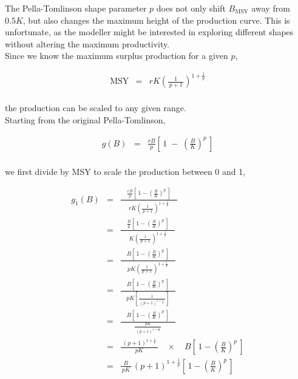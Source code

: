 \documentclass[fleqn]{article}
\newcommand{\MSY}{\mathrm{MSY}}
\newcommand{\msy}{_\mathrm{MSY}}
\begin{document}
\newpage

The Pella-Tomlinson shape parameter $p$ does not only shift $B\msy$ away from
$0.5K$, but also changes the maximum height of the production curve. This is
unfortunate, as the modeller might be interested in exploring different
shapes without altering the maximum productivity.\\[1em]

Since we know the maximum surplus production for a given $p$,

\begin{eqnarray*}
  \MSY &=& rK\!\left(\!\frac{1}{\,p+1\,}\!\right)^{\!1+\frac{1}{p}}\\[1ex]
\end{eqnarray*}

the production can be scaled to any given range.\\[1em]

Starting from the original Pella-Tomlinson,

\begin{eqnarray*}
  g(B) &=& \frac{rB}{p}\!\left[\,1 \;-\; \left(\frac{B}{K}\right)^{\!p}\,\right]\\[1ex]
\end{eqnarray*}

we first divide by MSY to scale the production between 0 and 1,

\newpage

\begin{eqnarray*}
  g_1(B) &=& \frac{\quad\frac{rB}{p}\!
    \left[\,1-\left(\frac{B}{K}\right)^p\,\right]\quad}
  {rK\!\left(\!\frac{1}{\,p+1\,}\!\right)^{\!1+\frac{1}{p}}}            \\[1em]
  ~    &=& \frac{\quad\frac{B}{p}\!
    \left[\,1-\left(\frac{B}{K}\right)^p\,\right]\quad}
  {K\!\left(\!\frac{1}{\,p+1\,}\!\right)^{\!1+\frac{1}{p}}}             \\[1em]
  ~    &=& \frac{\quad B\!
    \left[\,1-\left(\frac{B}{K}\right)^p\,\right]\quad}
  {pK\!\left(\!\frac{1}{\,p+1\,}\!\right)^{\!1+\frac{1}{p}}}            \\[1em]
  ~    &=& \frac{\quad B\!
    \left[\,1-\left(\frac{B}{K}\right)^p\,\right]\quad}
  {pK\!\left[\!\frac{1}{\,(p+1)^{\!1+\frac{1}{p}}\,}\!\right]}          \\[1em]
  ~    &=& \frac{\quad B\!
    \left[\,1-\left(\frac{B}{K}\right)^p\,\right]\quad}
  {\frac{pK}{\,(p+1)^{\!1+\frac{1}{p}}\,}}                              \\[1em]
  ~    &=& \frac{\;(p\!+\!1)^{1+\frac{1}{p}}\,}{pK} \quad\times\quad
  B\!\left[\,1-\left(\frac{B}{K}\right)^p\,\right]                      \\[1em]
  ~    &=& \frac{B}{\,pK\,}\,(p\!+\!1)^{1+\frac{1}{p}}
  \!\left[\,1-\left(\frac{B}{K}\right)^p\,\right]                       \\[1ex]
\end{eqnarray*}
\end{document}
